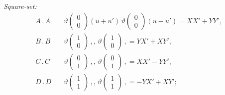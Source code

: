 \documentclass[11pt]{article}
\begin{document}
\textit{Square-set:}
\begin{align*}
A\mathbin{.}A\quad &\vartheta\!\begin{pmatrix} 0 \\ 0 \end{pmatrix}\!(u + u')\,\vartheta\!\begin{pmatrix} 0 \\ 0 \end{pmatrix}\!(u - u') = XX' + YY',\\
B\mathbin{.}B\quad &\vartheta\!\begin{pmatrix} 1 \\ 0 \end{pmatrix}\,,,\,\vartheta\!\begin{pmatrix} 1 \\ 0 \end{pmatrix}\,, = YX' + XY',\\
C\mathbin{.}C\quad &\vartheta\!\begin{pmatrix} 0 \\ 1 \end{pmatrix}\,,,\,\vartheta\!\begin{pmatrix} 0 \\ 1 \end{pmatrix}\,, = XX' - YY',\\
D\mathbin{.}D\quad &\vartheta\!\begin{pmatrix} 1 \\ 1 \end{pmatrix}\,,,\,\vartheta\!\begin{pmatrix} 1 \\ 1 \end{pmatrix}\,, = -YX' + XY';
\end{align*}
\end{document}

